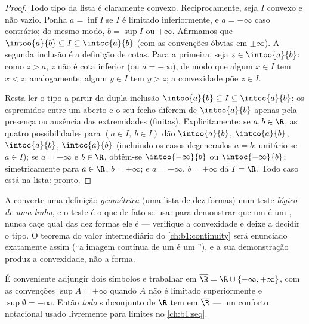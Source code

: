 \begin{proof}
Todo tipo da lista é claramente convexo. Reciprocamente, seja $I$ convexo
e não vazio. Ponha $a = \inf I$ se $I$ é limitado inferiormente, e $a =
-\infty$ caso contrário; do mesmo modo, $b = \sup I$ ou $+\infty$.
Afirmamos que $\intoo{a}{b}
\subseteq I \subseteq \intcc{a}{b}$ (com as convenções óbvias em
$\pm\infty$). A segunda inclusão é a definição de cotas. Para
a primeira, seja $z \in \intoo{a}{b}$: como $z > a$, $z$ não é cota
inferior (ou $a = -\infty$), de modo que algum $x \in I$ tem $x < z$;
analogamente, algum $y \in I$ tem $y > z$; a convexidade põe $z \in I$.

Resta ler o tipo a partir da dupla inclusão
$\intoo{a}{b} \subseteq I \subseteq \intcc{a}{b}$: os 
espremidos entre um  aberto e o seu fecho diferem de
$\intoo{a}{b}$ apenas pela presença ou ausência das extremidades
(finitas). Explicitamente: se $a, b \in \R$, as quatro possibilidades
para $(a \in I,\ b \in I)$ dão $\intoo{a}{b}$, $\intco{a}{b}$,
$\intoc{a}{b}$, $\intcc{a}{b}$ (incluindo os casos degenerados
$a = b$:  unitário se $a \in I$); se $a = -\infty$ e $b \in
\R$, obtêm-se $\intoo{-\infty}{b}$ ou $\intoc{-\infty}{b}$;
simetricamente para $a \in \R$, $b = +\infty$; e $a = -\infty$,
$b = +\infty$ dá $I = \R$. Todo caso está na lista: pronto.
\end{proof}

\begin{remark}
A  converte uma definição \emph{geométrica} (uma lista
de dez formas) num teste \emph{lógico de uma linha}, e o teste
é o que de fato se usa: para demonstrar que um  é um ,
nunca caçe qual das dez formas ele é --- verifique a convexidade
e deixe a  decidir o tipo. O teorema do valor
intermediário do \cref{ch:b1:continuity} será enunciado exatamente
assim (``a imagem contínua de um  é um
''), e a sua demonstração produz a convexidade, não a
forma.
\end{remark}

\begin{remark}
É conveniente adjungir dois símbolos e trabalhar em $\overline\R = \R
\cup \{-\infty, +\infty\}$, com as convenções $\sup A = +\infty$
quando $A$ não é limitado superiormente e $\sup \emptyset = -\infty$. Então
\emph{todo} subconjunto de $\R$ tem  em $\overline\R$ --- um
conforto notacional usado livremente para limites no \cref{ch:b1:seq}.
\end{remark}

